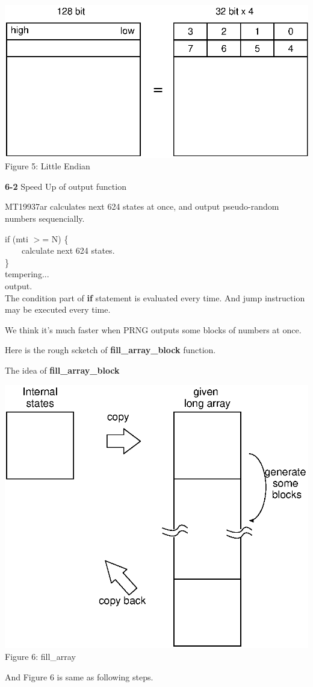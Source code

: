 \documentclass[a4j,12pt,landscape]{jarticle}
\begin{document}
\begin{center}
\includegraphics[width=0.7\linewidth]{little-endian.eps}
\\
Figure 5: Little Endian
\end{center}
\newpage
{\bf 6-2} Speed Up of output function

MT19937ar calculates next 624 states at once,
and output pseudo-random numbers sequencially.

\vspace{\baselineskip}
if (mti $>$= N) \{\\
~~~~calculate next 624 states.\\
\}\\
tempering...\\
output.\\

The condition part of {\bf if} statement is evaluated every time.
And jump instruction may be executed every time.

We think it's much faster when PRNG outputs
some blocks of numbers at once.

\newpage
Here is the rough scketch of {\bf fill\_array\_block} function.

The idea of {\bf fill\_array\_block}
\begin{center}
\includegraphics[width=0.7\linewidth,height=0.7\textheight,
keepaspectratio]{fill_array.eps}
\\
Figure 6: fill\_array
\end{center}
\newpage
And Figure 6 is same as following steps.
\end{document}
